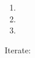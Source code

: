 \documentclass{article}
\begin{document}
\begin{enumerate}
\item {}

\item {}

\item {}
\end{enumerate}

Iterate:
\begin{enumerate}
\foreachproblem{\item \thisproblem}
\end{enumerate}
\end{document}

